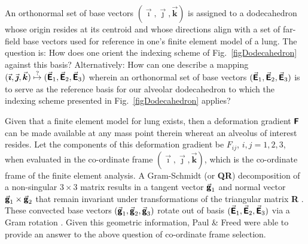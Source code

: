 An orthonormal set of base vectors $( \vec{\boldsymbol{\imath}} , \vec{\boldsymbol{\jmath}} , \vec{\boldsymbol{k}} )$ is assigned to a dodecahedron whose origin resides at its centroid and whose directions align with a set of far-field base vectors used for reference in one's finite element model of a lung.  The question is: How does one orient the indexing scheme of Fig.~\ref{figDodecahedron} against this basis?  Alternatively:  How can one describe a mapping $( \vec{\boldsymbol{\imath}} , \vec{\boldsymbol{\jmath}} , \vec{\boldsymbol{k}} ) \overset{\text{?}}{\mapsto} ( \vec{\boldsymbol{\mathsf{E}}}_1 , \vec{\boldsymbol{\mathsf{E}}}_2 , \vec{\boldsymbol{\mathsf{E}}}_3 )$ wherein an ortho\-normal set of base vectors $( \vec{\boldsymbol{\mathsf{E}}}_1 , \vec{\boldsymbol{\mathsf{E}}}_2 , \vec{\boldsymbol{\mathsf{E}}}_3 )$ is to serve as the reference basis for our alveolar dodecahedron to which the indexing scheme presented in Fig.~\ref{figDodecahedron} applies?

Given that a finite element model for lung exists, then a deformation gradient $\boldsymbol{\mathsf{F}}$ can be made available at any mass point therein whereat an alveolus of interest resides.  Let the components of this deformation gradient be $F_{ij}$, $i, j = 1,2,3$, when evaluated in the co-ordinate frame $( \vec{\boldsymbol{\imath}} , \vec{\boldsymbol{\jmath}} , \vec{\boldsymbol{k}} )$, which is the co-ordinate frame of the finite element analysis.  A Gram-Schmidt (or \textbf{QR}) decomposition of a non-singular $3 \! \times \! 3$ matrix results in a tangent vector $\vec{\boldsymbol{\mathsf{g}}}_1$ and normal vector $\vec{\boldsymbol{\mathsf{g}}}_1 \times \vec{\boldsymbol{\mathsf{g}}}_2$ that remain invariant under transformations of the triangular matrix \textbf{R} \cite{McLellan80}.  These convected base vectors $( \vec{\boldsymbol{\mathsf{g}}}_1 , \vec{\boldsymbol{\mathsf{g}}}_2 , \vec{\boldsymbol{\mathsf{g}}}_3 )$ rotate out of basis $( \vec{\boldsymbol{\mathsf{E}}}_1 , \vec{\boldsymbol{\mathsf{E}}}_2 , \vec{\boldsymbol{\mathsf{E}}}_3 )$ via a Gram rotation \cite{FreedZamani18}.  Given this geometric information, Paul \& Freed \cite{Pauletal20} were able to provide an answer to the above question of co-ordinate frame selection.

